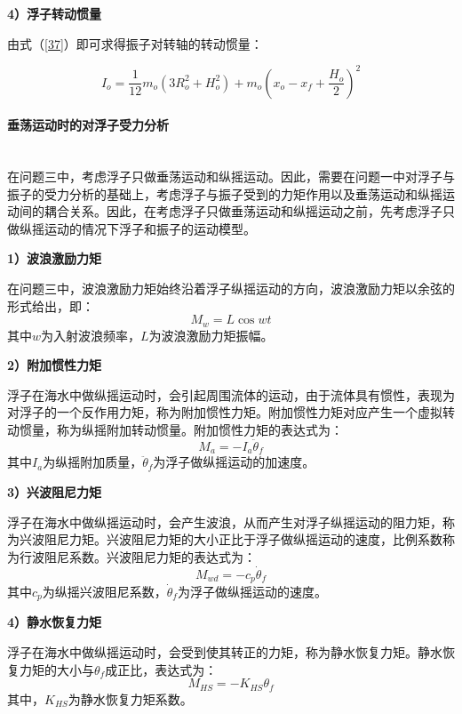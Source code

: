 \documentclass{my_paper}
\newcommand{\subsubsubsection}[1]{\paragraph{#1}\mbox{}\\}
\begin{document}
\textbf{4）浮子转动惯量}

由式（\ref{37}）即可求得振子对转轴的转动惯量：

\begin{equation}
    I_o=\frac{1}{12}m_o (3R_o^{2} + H_o^2)+m_o(x_o-x_f+\frac{H_o}{2})^2
\end{equation}

\subsubsubsection{垂荡运动时的对浮子受力分析}

在问题三中，考虑浮子只做垂荡运动和纵摇运动。因此，需要在问题一中对浮子与振子的受力分析的基础上，考虑浮子与振子受到的力矩作用以及垂荡运动和纵摇运动间的耦合关系。因此，在考虑浮子只做垂荡运动和纵摇运动之前，先考虑浮子只做纵摇运动的情况下浮子和振子的运动模型\cite{周丙浩2018纵摇浮子式波浪能转换装置研究}。


\textbf{1）波浪激励力矩}

在问题三中，波浪激励力矩始终沿着浮子纵摇运动的方向，波浪激励力矩以余弦的形式给出，即：
\begin{equation}
    M_w=L\cos wt\label{Q3fbolanjililiju}
\end{equation}
其中$w$为入射波浪频率，$L$为波浪激励力矩振幅。


\textbf{2）附加惯性力矩}

浮子在海水中做纵摇运动时，会引起周围流体的运动，由于流体具有惯性，表现为对浮子的一个反作用力矩，称为附加惯性力矩。附加惯性力矩对应产生一个虚拟转动惯量，称为纵摇附加转动惯量。附加惯性力矩的表达式为：
\begin{equation}
    M_a=-I_{a}\ddot \theta_{f}\label{Q3ffujiaguanxingliju}
\end{equation}
其中$I_{a}$为纵摇附加质量，$\ddot \theta_{f}$为浮子做纵摇运动的加速度。

\textbf{3）兴波阻尼力矩}

浮子在海水中做纵摇运动时，会产生波浪，从而产生对浮子纵摇运动的阻力矩，称为兴波阻尼力矩。兴波阻尼力矩的大小正比于浮子做纵摇运动的速度，比例系数称为行波阻尼系数。兴波阻尼力矩的表达式为：
\begin{equation}
    M_{wd}=-c_{p}\dot \theta_{f}\label{Q3fxingbozuniliju}
\end{equation}
其中$c_{p}$为纵摇兴波阻尼系数，$\dot \theta_{f}$为浮子做纵摇运动的速度。

\textbf{4）静水恢复力矩}

浮子在海水中做纵摇运动时，会受到使其转正的力矩，称为静水恢复力矩。静水恢复力矩的大小与$\theta_{f}$成正比，表达式为：
\begin{equation}
    M_{HS}=-K_{HS}\theta_{f}\label{Q3jingshuihuifuliju}
\end{equation}
其中，$K_{HS}$为静水恢复力矩系数。
\end{document}
